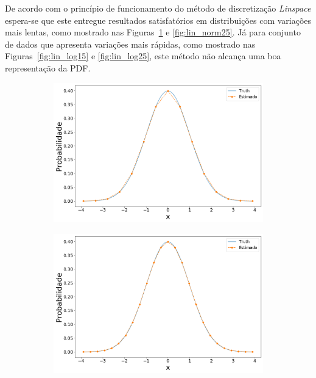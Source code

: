 De acordo com o princípio de funcionamento do método de discretização \textit{Linspace} espera-se que este entregue resultados satisfatórios em distribuições com variações mais lentas, como mostrado nas Figuras~\ref{fig:lin_norm15} e \ref{fig:lin_norm25}. Já para conjunto de dados que apresenta variações mais rápidas, como mostrado nas Figuras~\ref{fig:lin_log15} e \ref{fig:lin_log25}, este método não alcança uma boa representação da PDF.


\begin{figure}[H]
	\centering
	\begin{subfigure}[b]{0.45\textwidth}
		\centering 
		\includegraphics[width=\linewidth]{./figuras/Linspace_normal_15}
		\caption{}
		\label{fig:lin_norm15}
	\end{subfigure}
	\hfill
	\begin{subfigure}[b]{0.45\textwidth}
		\centering 
		\includegraphics[width=\linewidth]{./figuras/Linspace_normal_25}

\end{subfigure}
\end{figure}
